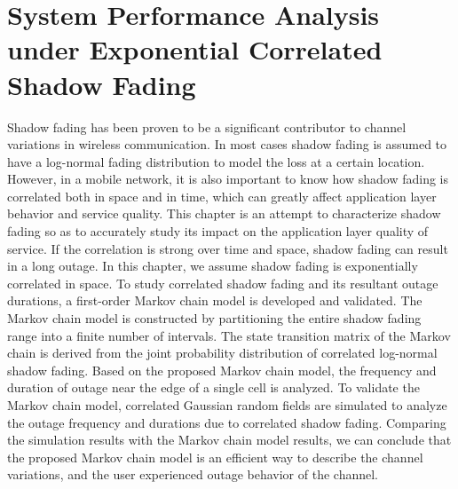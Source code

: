 \chapter{System Performance Analysis under Exponential Correlated Shadow Fading}\label{ch:ExpSingleCell}
\par Shadow fading has been proven to be a significant contributor to channel variations in wireless communication. In most cases shadow fading is assumed to have a log-normal fading distribution to model the loss at a certain location. However, in a mobile network, it is also important to know how shadow fading is correlated both in space and in time, which can greatly affect application layer behavior and service quality. This chapter is an attempt to characterize shadow fading so as to accurately study its impact on the application layer quality of service. If the correlation is strong over time and space, shadow fading can result in a long outage. In this chapter, we assume shadow fading is exponentially correlated in space. To study correlated shadow fading and its resultant outage durations, a first-order Markov chain model is developed and validated. The Markov chain model is constructed by partitioning the entire shadow fading range into a finite number of intervals. The state transition matrix of the Markov chain is derived from the joint probability distribution of correlated log-normal shadow fading. Based on the proposed Markov chain model, the frequency and duration of outage near the edge of a single cell is analyzed. To validate the Markov chain model, correlated Gaussian random fields are simulated to analyze the outage frequency and durations due to correlated shadow fading. Comparing the simulation results with the Markov chain model results, we can conclude that the proposed Markov chain model is an efficient way to describe the channel variations, and the user experienced outage behavior of the channel.
